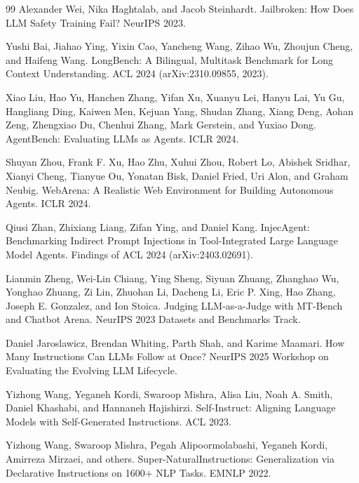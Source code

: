 \documentclass{article}
\begin{document}
\begin{thebibliography}{99}
Alexander Wei, Nika Haghtalab, and Jacob Steinhardt.
\newblock Jailbroken: How Does LLM Safety Training Fail?
\newblock NeurIPS 2023.

Yushi Bai, Jiahao Ying, Yixin Cao, Yancheng Wang, Zihao Wu, Zhoujun Cheng, and Haifeng Wang.
\newblock LongBench: A Bilingual, Multitask Benchmark for Long Context Understanding.
\newblock ACL 2024 (arXiv:2310.09855, 2023).

Xiao Liu, Hao Yu, Hanchen Zhang, Yifan Xu, Xuanyu Lei, Hanyu Lai, Yu Gu, Hangliang Ding, Kaiwen Men, Kejuan Yang, Shudan Zhang, Xiang Deng, Aohan Zeng, Zhengxiao Du, Chenhui Zhang, Mark Gerstein, and Yuxiao Dong.
\newblock AgentBench: Evaluating LLMs as Agents.
\newblock ICLR 2024.

Shuyan Zhou, Frank F. Xu, Hao Zhu, Xuhui Zhou, Robert Lo, Abishek Sridhar, Xianyi Cheng, Tianyue Ou, Yonatan Bisk, Daniel Fried, Uri Alon, and Graham Neubig.
\newblock WebArena: A Realistic Web Environment for Building Autonomous Agents.
\newblock ICLR 2024.

Qiusi Zhan, Zhixiang Liang, Zifan Ying, and Daniel Kang.
\newblock InjecAgent: Benchmarking Indirect Prompt Injections in Tool-Integrated Large Language Model Agents.
\newblock Findings of ACL 2024 (arXiv:2403.02691).

Lianmin Zheng, Wei-Lin Chiang, Ying Sheng, Siyuan Zhuang, Zhanghao Wu, Yonghao Zhuang, Zi Lin, Zhuohan Li, Dacheng Li, Eric P. Xing, Hao Zhang, Joseph E. Gonzalez, and Ion Stoica.
\newblock Judging LLM-as-a-Judge with MT-Bench and Chatbot Arena.
\newblock NeurIPS 2023 Datasets and Benchmarks Track.

Daniel Jaroslawicz, Brendan Whiting, Parth Shah, and Karime Maamari.
\newblock How Many Instructions Can LLMs Follow at Once?
\newblock NeurIPS 2025 Workshop on Evaluating the Evolving LLM Lifecycle.

Yizhong Wang, Yeganeh Kordi, Swaroop Mishra, Alisa Liu, Noah A. Smith, Daniel Khashabi, and Hannaneh Hajishirzi.
\newblock Self-Instruct: Aligning Language Models with Self-Generated Instructions.
\newblock ACL 2023.

Yizhong Wang, Swaroop Mishra, Pegah Alipoormolabashi, Yeganeh Kordi, Amirreza Mirzaei, and others.
\newblock Super-NaturalInstructions: Generalization via Declarative Instructions on 1600+ NLP Tasks.
\newblock EMNLP 2022.


\end{thebibliography}
\end{document}
